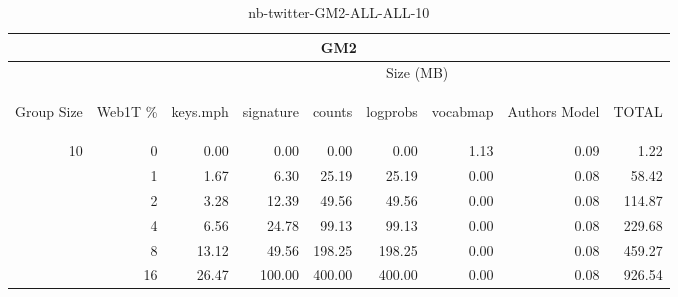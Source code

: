 \begin{center}
\begin{table}[htbp] 
 \begin{center}
\begin{tabular}{ | r | r | r | r | r | r | r | r | r |}
\hline
\multicolumn{9}{|c|}{GM2}\\
\hline
 & & \multicolumn{7}{|c|}{Size (MB)}\\ \cline{3-9}
\begin{sideways}Group Size\end{sideways} & \begin{sideways}Web1T \% \end{sideways} & \begin{sideways}keys.mph\end{sideways} & \begin{sideways}signature\end{sideways} & \begin{sideways}counts\end{sideways} & \begin{sideways}logprobs\end{sideways} & \begin{sideways}vocabmap\end{sideways} & \begin{sideways}Authors Model \end{sideways} & \begin{sideways}TOTAL\end{sideways}\\
\hline
\multirow{5}{*}{10}
 & 0 & 0.00 & 0.00 & 0.00 & 0.00 & 1.13 & 0.09 & 1.22\\ \cline{2-9}
 & 1 & 1.67 & 6.30 & 25.19 & 25.19 & 0.00 & 0.08 & 58.42\\ \cline{2-9}
 & 2 & 3.28 & 12.39 & 49.56 & 49.56 & 0.00 & 0.08 & 114.87\\ \cline{2-9}
 & 4 & 6.56 & 24.78 & 99.13 & 99.13 & 0.00 & 0.08 & 229.68\\ \cline{2-9}
 & 8 & 13.12 & 49.56 & 198.25 & 198.25 & 0.00 & 0.08 & 459.27\\ \cline{2-9}
 & 16 & 26.47 & 100.00 & 400.00 & 400.00 & 0.00 & 0.08 & 926.54\\ \cline{2-9}
\hline
\end{tabular}
\caption{nb-twitter-GM2-ALL-ALL-10}
\label{table:nb-twitter-GM2-ALL-ALL-10}
\end{center}
 \end{table}
\end{center}

